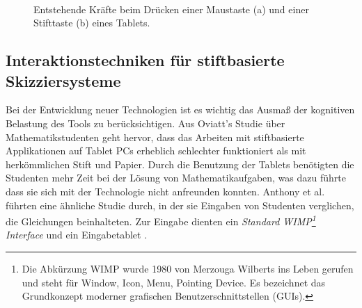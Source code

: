 \begin{figure}
        \myfloatalign
         \quad
         \\
        \caption[Kräfte bei Buttonklicks. \newline \citep{Johnson:2009}]{Entstehende Kräfte beim Drücken einer Maustaste (a) und einer Stifttaste (b) eines Tablets.}\label{fig:johnsonButtonPress}
\end{figure}
\clearpage

\subsection{Interaktionstechniken für stiftbasierte Skizziersysteme} 
Bei der Entwicklung neuer Technologien ist es wichtig das Ausmaß der kognitiven Belastung des Tools zu berücksichtigen. Aus Oviatt's Studie \citep{Oviatt:2006} über Mathematikstudenten geht hervor, dass das Arbeiten mit stiftbasierte Applikationen auf Tablet PCs erheblich schlechter funktioniert als mit herkömmlichen Stift und Papier. Durch die Benutzung der Tablets benötigten die Studenten mehr Zeit bei der Lösung von Mathematikaufgaben, was dazu führte dass sie sich mit der Technologie nicht anfreunden konnten. Anthony et al. führten eine ähnliche Studie durch, in der sie Eingaben von Studenten verglichen, die Gleichungen beinhalteten. Zur Eingabe dienten ein \emph{Standard \acs{WIMP}\footnote{Die Abkürzung WIMP wurde 1980 von Merzouga Wilberts ins Leben gerufen und steht für Window, Icon, Menu, Pointing Device. Es bezeichnet das Grundkonzept moderner grafischen Benutzerschnittstellen (\acp{GUI}).} Interface} und ein Eingabetablet \citep{Anthony:2005}. 

